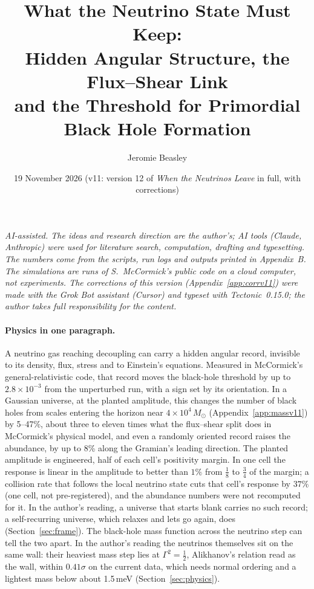 \documentclass[11pt]{article}
\title{What the Neutrino State Must Keep:\\ Hidden Angular Structure, the Flux--Shear Link\\ and the Threshold for Primordial Black Hole Formation}
\author{Jeromie Beasley}
\date{19 November 2026 \quad (v11: version 12 of \emph{When the Neutrinos Leave} in full, with corrections)}
\begin{document}
\maketitle

\noindent\emph{AI-assisted. The ideas and research direction are the author's; AI tools (Claude, Anthropic) were used for literature search, computation, drafting and typesetting. The numbers come from the scripts, run logs and outputs printed in Appendix~B. The simulations are runs of S.~McCormick's public code on a cloud computer, not experiments. The corrections of this version (Appendix~\ref{app:corrv11}) were made with the Grok Bot assistant (Cursor) and typeset with Tectonic~0.15.0; the author takes full responsibility for the content.}

\paragraph{Physics in one paragraph.} A neutrino gas reaching decoupling can carry a hidden angular record, invisible to its density, flux, stress and to Einstein's equations. Measured in McCormick's general-relativistic code, that record moves the black-hole threshold by up to $2.8\times10^{-3}$ from the unperturbed run, with a sign set by its orientation. In a Gaussian universe, at the planted amplitude, this changes the number of black holes from scales entering the horizon near $4\times10^4\,M_\odot$ (Appendix~\ref{app:massv11}) by 5--47\%, about three to eleven times what the flux--shear split does in McCormick's physical model, and even a randomly oriented record raises the abundance, by up to 8\% along the Gramian's leading direction. The planted amplitude is engineered, half of each cell's positivity margin. In one cell the response is linear in the amplitude to better than $1\%$ from $\tfrac18$ to $\tfrac34$ of the margin; a collision rate that follows the local neutrino state cuts that cell's response by $37\%$ (one cell, not pre-registered), and the abundance numbers were not recomputed for it. In the author's reading, a universe that starts blank carries no such record; a self-recurring universe, which relaxes and lets go again, does (Section~\ref{sec:frame}). The black-hole mass function across the neutrino step can tell the two apart. In the author's reading the neutrinos themselves sit on the same wall: their heaviest mass step lies at $\Gamma^2=\tfrac12$, Alikhanov's relation read as the wall, within $0.41\sigma$ on the current data, which needs normal ordering and a lightest mass below about 1.5\,meV (Section~\ref{sec:physics}).
\end{document}

